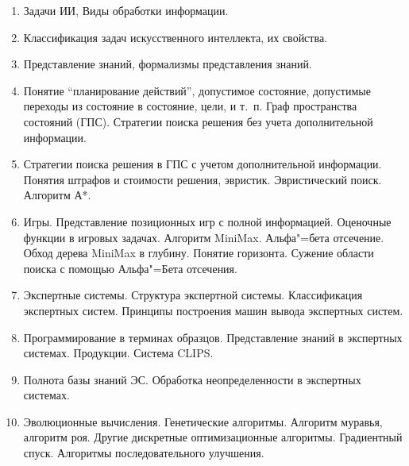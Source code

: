 \documentclass[final,a4paper,12pt]{report}
\begin{document}
\begin{enumerate}
  \begin{enumerate}
  \item Задачи ИИ, Виды обработки информации.
  \item Классификация задач искусственного интеллекта, их свойства.
  \item Представление знаний, формализмы представления знаний.
  \item Понятие “планирование действий”, допустимое состояние,
    допустимые переходы из состояние в состояние, цели, и т.~п.  Граф
    пространства состояний (ГПС).  Стратегии поиска решения без учета
    дополнительной информации.
  \item Стратегии поиска решения в ГПС с учетом дополнительной
    информации.  Понятия штрафов и стоимости решения,
    эвристик. Эвристический поиск. Алгоритм А*.
  \item Игры. Представление позиционных игр с полной информацией.
    Оценочные функции в игровых задачах.  Алгоритм
    MiniMax. Альфа"=бета отсечение.  Обход дерева MiniMax в
    глубину. Понятие горизонта. Сужение области поиска с помощью
    Альфа"=Бета отсечения.
  \item Экспертные системы. Структура экспертной
    системы. Классификация экспертных систем.  Принципы построения
    машин вывода экспертных систем.
  \item Программирование в терминах образцов.  Представление знаний в
    экспертных системах. Продукции.  Система CLIPS.
  \item Полнота базы знаний ЭС. Обработка неопределенности в
    экспертных системах.
  \item Эволюционные вычисления. Генетические алгоритмы.  Алгоритм
    муравья, алгоритм роя. Другие дискретные оптимизационные
    алгоритмы.  Градиентный спуск. Алгоритмы последовательного
    улучшения.
  \end{enumerate}
\end{enumerate}
\end{document}
